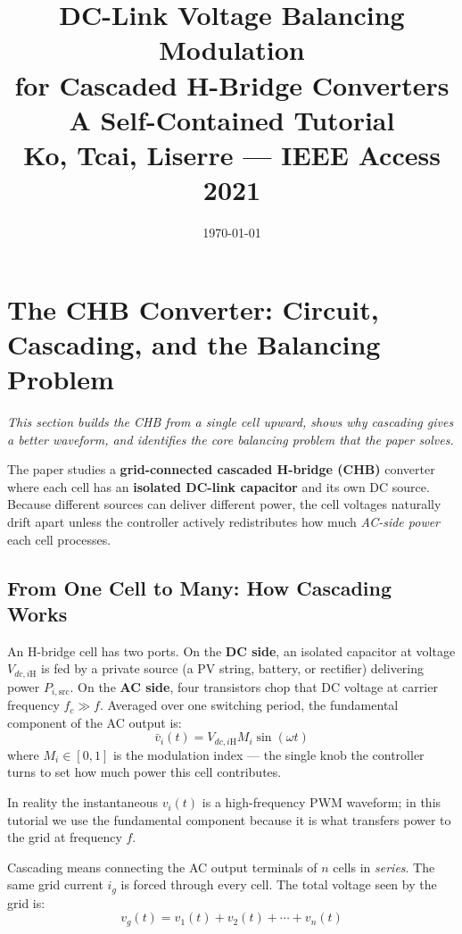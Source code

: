 \documentclass[12pt, a4paper]{article}
\title{\textbf{DC-Link Voltage Balancing Modulation}\\[4pt]
       \textbf{for Cascaded H-Bridge Converters}\\[6pt]
       \large A Self-Contained Tutorial\\[4pt]
       \normalsize Ko, Tcai, Liserre --- IEEE Access 2021}
\date{\today}
\def\,{ }%
\newcommand{\vg}{v_{g}}
\newcommand{\ig}{i_{g}}
\newcommand{\omg}{\omega}
\newcommand{\Vdci}[1]{V_{dc,#1\mathrm{H}}}
\newcommand{\Mi}{M_{i}}
\begin{document}
\maketitle
\tableofcontents
\clearpage

\section{The CHB Converter: Circuit, Cascading, and the Balancing Problem}
\label{sec:circuit}

\textit{This section builds the CHB from a single cell upward, shows why cascading
gives a better waveform, and identifies the core balancing problem that the paper
solves.}

The paper studies a
\textbf{grid-connected cascaded H-bridge (CHB)} converter where each cell has an
\textbf{isolated DC-link capacitor} and its own DC source.
Because different sources can deliver different power, the cell voltages naturally
drift apart unless the controller actively redistributes how much \emph{AC-side power}
each cell processes.

\subsection{From One Cell to Many: How Cascading Works}
\label{subsec:cascading}

An H-bridge cell has two ports.
On the \textbf{DC side}, an isolated capacitor at voltage $\Vdci{i}$ is fed
by a private source (a PV string, battery, or rectifier) delivering power
$P_{i,\mathrm{src}}$.
On the \textbf{AC side}, four transistors chop that DC voltage at carrier
frequency $f_c \gg f$.
Averaged over one switching period, the fundamental component of the AC
output is:
\[
    \bar{v}_i(t) = \Vdci{i}\,\Mi\,\sin(\omg t)
\]
where $\Mi \in [0,1]$ is the modulation index --- the single knob the
controller turns to set how much power this cell contributes.

In reality the instantaneous $v_i(t)$ is a high-frequency PWM waveform; in this
tutorial we use the fundamental component because it is what transfers power to
the grid at frequency $f$.

Cascading means connecting the AC output terminals of $n$ cells in
\emph{series}.
The same grid current $\ig$ is forced through every cell.
The total voltage seen by the grid is:
\[
    \vg(t) = v_1(t) + v_2(t) + \cdots + v_n(t)
\]
\end{document}

